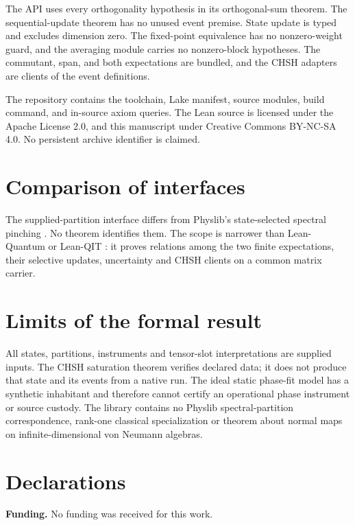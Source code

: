 \documentclass[11pt]{article}
\renewcommand{\_}{\textunderscore\allowbreak}
\theoremstyle{remark}
\begin{document}
The API uses every orthogonality hypothesis in its orthogonal-sum
theorem. The sequential-update theorem has no unused event premise. State
update is typed and excludes dimension zero. The fixed-point equivalence has
no nonzero-weight guard, and the averaging module carries no nonzero-block
hypotheses. The commutant, span, and both expectations are bundled, and the
CHSH adapters are clients of the event definitions.

The repository contains the toolchain, Lake manifest, source modules, build
command, and in-source axiom queries. The Lean source is licensed under the
Apache License 2.0, and this manuscript under Creative Commons BY-NC-SA 4.0.
No persistent archive identifier is claimed.

\section{Comparison of interfaces}
\label{sec:comparison}

The supplied-partition interface differs from Physlib's state-selected
spectral pinching \cite{physlibPinching2026}. No theorem identifies them.
The scope is narrower than Lean-Quantum or Lean-QIT
\cite{kasauraEtAl2026LeanQuantum,zhuEtAl2026LeanQIT}: it proves relations
among the two finite expectations, their selective updates, uncertainty
and CHSH clients on a common matrix carrier.

\section{Limits of the formal result}
\label{sec:conclusion}

All states, partitions, instruments and tensor-slot interpretations are
supplied inputs. The CHSH saturation theorem verifies declared data; it
does not produce that state and its events from a native run. The ideal
static phase-fit model has a synthetic inhabitant and therefore cannot
certify an operational phase instrument or source custody. The library contains no Physlib spectral-partition
correspondence, rank-one classical specialization or theorem about normal
maps on infinite-dimensional von Neumann algebras.

\section*{Declarations}

\textbf{Funding.} No funding was received for this work.
\end{document}
